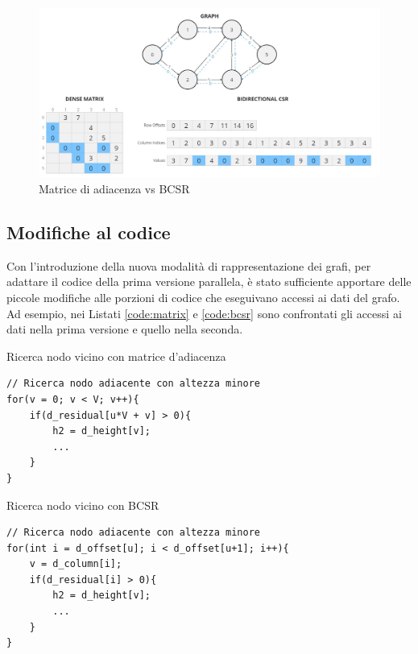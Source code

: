             \begin{figure}[h]
                \centering
                \includegraphics[width=1\linewidth]{images/bcsr-example.jpg}
                \caption{Matrice di adiacenza vs BCSR}
                \label{fig:BCSR-example}
            \end{figure}


            

        \subsection{Modifiche al codice}

            Con l'introduzione della nuova modalità di rappresentazione dei grafi, per adattare il codice della prima versione parallela, è stato sufficiente apportare delle piccole modifiche alle porzioni di codice che eseguivano accessi ai dati del grafo. Ad esempio, nei Listati \ref{code:matrix} e \ref{code:bcsr} sono confrontati gli accessi ai dati nella prima versione e quello nella seconda.
            
            \begin{listing}[h]
            \caption{Ricerca nodo vicino con matrice d'adiacenza}\label{code:matrix}
                \begin{verbatim}
// Ricerca nodo adiacente con altezza minore
for(v = 0; v < V; v++){
    if(d_residual[u*V + v] > 0){
        h2 = d_height[v];
        ...
    }
}
                \end{verbatim}
            \end{listing}
            
            \begin{listing}[h]
                \caption{Ricerca nodo vicino con BCSR}\label{code:bcsr}
                \begin{verbatim}
// Ricerca nodo adiacente con altezza minore
for(int i = d_offset[u]; i < d_offset[u+1]; i++){
    v = d_column[i];
    if(d_residual[i] > 0){
        h2 = d_height[v];
        ...
    }   
}
                \end{verbatim}
            \end{listing}

